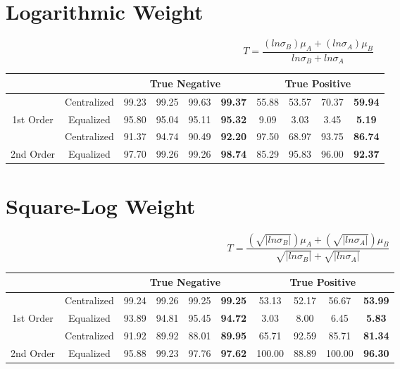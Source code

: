 \documentclass[10pt,a4paper]{article}
\begin{document}
	\section{Logarithmic Weight}
		$$T = \frac{(ln\sigma_B)\mu_A + (ln\sigma_A)\mu_B}{ln\sigma_B + ln\sigma_A}$$
		\begin{table}[!h]
			\centering
			\begin{tabular}{|c|c|c|c|c|c|c|c|c|c|}
				\hline
				&             & \multicolumn{4}{c|}{True Negative}                            & \multicolumn{4}{c|}{True Positive}                            \\ \hline
				& Centralized & 99.23 & 99.25 & 99.63 & {\color[HTML]{FE0000} \textbf{99.37}} & 55.88 & 53.57 & 70.37 & {\color[HTML]{FE0000} \textbf{59.94}} \\ \cline{2-10} 
				\multirow{-2}{*}{1st Order} & Equalized   & 95.80 & 95.04 & 95.11 & {\color[HTML]{FE0000} \textbf{95.32}} & 9.09  & 3.03  & 3.45  & {\color[HTML]{FE0000} \textbf{5.19}}  \\ \hline
				& Centralized & 91.37 & 94.74 & 90.49 & {\color[HTML]{FE0000} \textbf{92.20}} & 97.50 & 68.97 & 93.75 & {\color[HTML]{FE0000} \textbf{86.74}} \\ \cline{2-10} 
				\multirow{-2}{*}{2nd Order} & Equalized   & 97.70 & 99.26 & 99.26 & {\color[HTML]{FE0000} \textbf{98.74}} & 85.29 & 95.83 & 96.00 & {\color[HTML]{FE0000} \textbf{92.37}} \\ \hline
			\end{tabular}
		\end{table}
	
	\section{Square-Log Weight}
		$$T = \frac{(\sqrt{|ln\sigma_B|})\mu_A + (\sqrt{|ln\sigma_A|})\mu_B}{\sqrt{|ln\sigma_B|} + \sqrt{|ln\sigma_A|}}$$
		\begin{table}[!h]
			\centering
			\begin{tabular}{|c|c|c|c|c|c|c|c|c|c|}
				\hline
				&             & \multicolumn{4}{c|}{True Negative}                            & \multicolumn{4}{c|}{True Positive}                              \\ \hline
				& Centralized & 99.24 & 99.26 & 99.25 & {\color[HTML]{FE0000} \textbf{99.25}} & 53.13  & 52.17 & 56.67  & {\color[HTML]{FE0000} \textbf{53.99}} \\ \cline{2-10} 
				\multirow{-2}{*}{1st Order} & Equalized   & 93.89 & 94.81 & 95.45 & {\color[HTML]{FE0000} \textbf{94.72}} & 3.03   & 8.00  & 6.45   & {\color[HTML]{FE0000} \textbf{5.83}}  \\ \hline
				& Centralized & 91.92 & 89.92 & 88.01 & {\color[HTML]{FE0000} \textbf{89.95}} & 65.71  & 92.59 & 85.71  & {\color[HTML]{FE0000} \textbf{81.34}} \\ \cline{2-10} 
				\multirow{-2}{*}{2nd Order} & Equalized   & 95.88 & 99.23 & 97.76 & {\color[HTML]{FE0000} \textbf{97.62}} & 100.00 & 88.89 & 100.00 & {\color[HTML]{FE0000} \textbf{96.30}} \\ \hline
			\end{tabular}
		\end{table}
		
\end{document}
